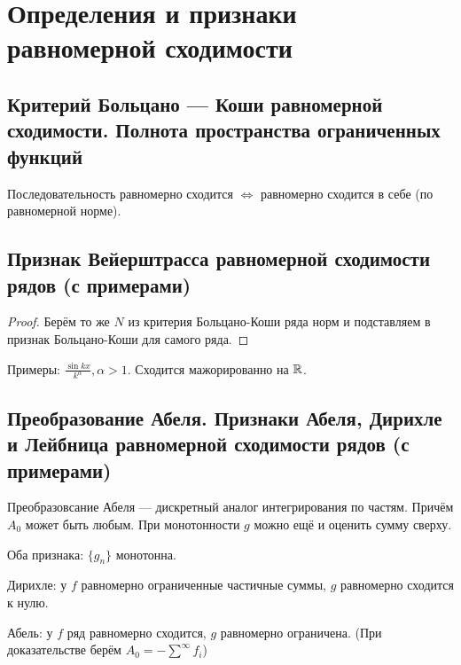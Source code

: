 \documentclass[12pt, a4paper, oneside]{memoir}
\begin{document}
\section{Определения и признаки равномерной сходимости}

\subsection{Критерий Больцано — Коши равномерной сходимости. Полнота пространства ограниченных функций}

\begin{theorem}

    Последовательность равномерно сходится $\Leftrightarrow$ равномерно сходится в себе (по равномерной норме).
\end{theorem}

\subsection{Признак Вейерштрасса равномерной сходимости рядов (с примерами)}

\begin{theorem}
    
    \begin{proof}
        Берём то же $N$ из критерия Больцано-Коши ряда норм и подставляем в признак Больцано-Коши для самого ряда.
    \end{proof}
\end{theorem} 

Примеры: $\frac{\sin kx}{k^\alpha}, \alpha > 1$. Сходится мажорированно на ${\mathbb{R}}$.

\subsection{Преобразование Абеля. Признаки Абеля, Дирихле и Лейбница равномерной сходимости рядов (с примерами)}

Преобразовсание Абеля — дискретный аналог интегрирования по частям. Причём $A_0$ может быть любым.
При монотонности $g$ можно ещё и оценить сумму сверху.

Оба признака: $\{g_n\}$ монотонна.

Дирихле: у $f$ равномерно ограниченные частичные суммы, $g$ равномерно сходится к нулю.

Абель: у $f$ ряд равномерно сходится, $g$ равномерно ограничена. (При доказательстве берём $A_0 = -\sum^\infty f_i$)
\end{document}
